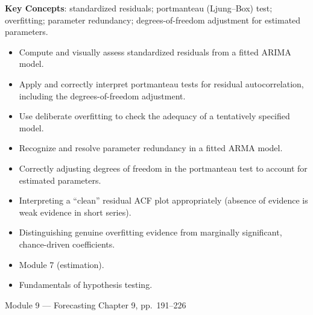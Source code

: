 \documentclass[11pt]{article}
\newcommand{\keyconcepts}{\textbf{\color{modblue}Key Concepts}}
\begin{document}
\keyconcepts: standardized residuals; portmanteau (Ljung--Box) test; overfitting; parameter redundancy; degrees-of-freedom adjustment for estimated parameters.

\begin{objectives}
\begin{itemize}
  \item Compute and visually assess standardized residuals from a fitted ARIMA model.
  \item Apply and correctly interpret portmanteau tests for residual autocorrelation, including the degrees-of-freedom adjustment.
  \item Use deliberate overfitting to check the adequacy of a tentatively specified model.
  \item Recognize and resolve parameter redundancy in a fitted ARMA model.
\end{itemize}
\end{objectives}

\begin{difficult}
\begin{itemize}
  \item Correctly adjusting degrees of freedom in the portmanteau test to account for estimated parameters.
  \item Interpreting a ``clean'' residual ACF plot appropriately (absence of evidence is weak evidence in short series).
  \item Distinguishing genuine overfitting evidence from marginally significant, chance-driven coefficients.
\end{itemize}
\end{difficult}

\begin{prereqs}
\begin{itemize}
  \item Module 7 (estimation).
  \item Fundamentals of hypothesis testing.
\end{itemize}
\end{prereqs}

\vspace{6pt}
\begin{moduletitle}{Module 9 --- Forecasting}
\small Chapter 9, pp.\ 191--226
\end{moduletitle}
\end{document}
